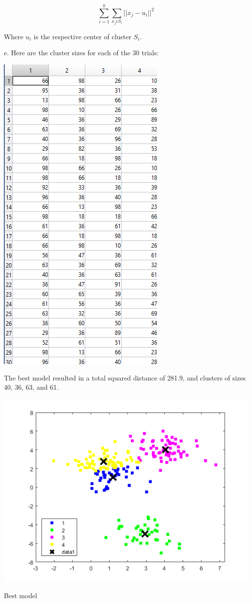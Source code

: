 \documentclass{article}
\begin{document}
\[ \sum_{i=1}^{k} \sum_{x_j\epsilon S_i} ||x_j-u_i||^2 \]

\noindent
Where $u_i$ is the respective center of cluster $S_i$.

\noindent 
e. Here are the cluster sizes for each of the 30 trials:

\begin{center}
    \includegraphics[scale=0.75]{1e-2.png}
\end{center}

\noindent 
The best model resulted in a total squared distance of 281.9, and clusters of sizes 40, 36, 63, and 61.

\begin{center}
    \includegraphics[scale=1]{1e.png}
    \caption{Best model}
\end{center}
\end{document}

